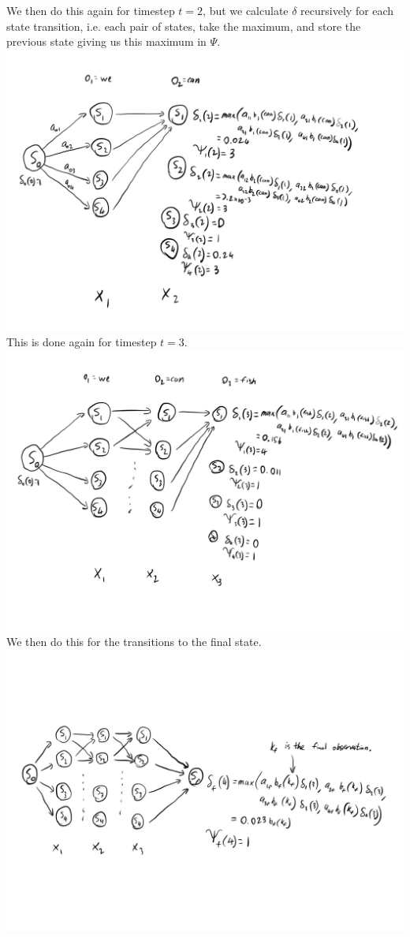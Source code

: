 \documentclass[12pt]{article}
\begin{document}
\begin{enumerate}
    We then do this again for timestep $t = 2$, but we calculate $\delta$ recursively for each state transition, i.e. each pair of states, take the maximum, and store the previous state giving us this maximum in $\Psi$.\\
    \includegraphics[scale=0.125]{3-2.jpg}\\
    This is done again for timestep $t=3$.\\
    \includegraphics[scale=0.125]{3-3.jpg}\\
    We then do this for the transitions to the final state.\\
    \includegraphics[scale=0.125]{3-4.jpg}\\

\end{enumerate}
\end{document}
